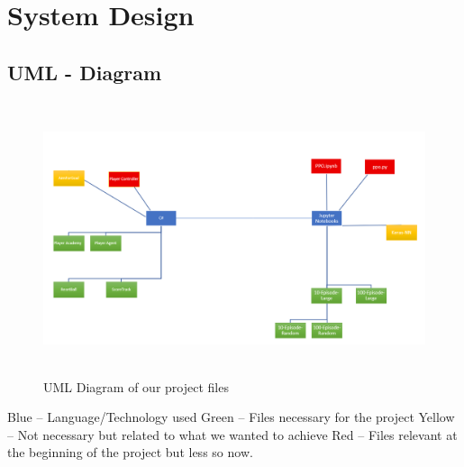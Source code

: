 
\chapter{System Design}

\section{UML - Diagram}

\begin{figure}[H]
    \centering
    \includegraphics[width=130mm, height=80mm]{img/UML.PNG}
    \caption{UML Diagram of our project files}
    \label{fig:uml}
\end{figure}

Blue – Language/Technology used \newline
Green – Files necessary for the project \newline
Yellow – Not necessary but related to what we wanted to achieve \newline
Red – Files relevant at the beginning of the project but less so now. \newline

